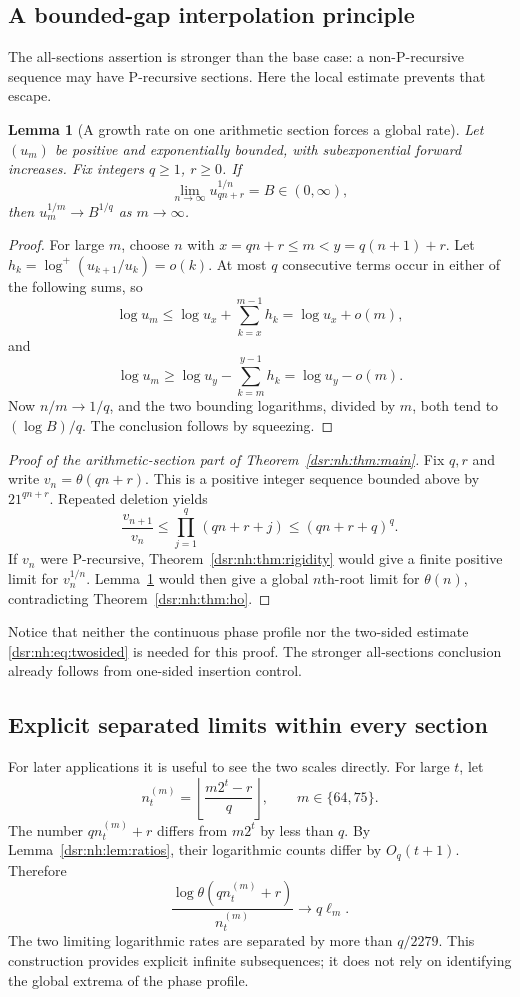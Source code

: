 \documentclass[11pt,a4paper]{article}
\numberwithin{equation}{section}
\newtheorem{lemma}[theorem]{Lemma}
\theoremstyle{definition}
\theoremstyle{remark}
\newcommand{\tht}{\theta}
\newcommand{\logp}{\log^{+}}
\theoremstyle{definition}
\theoremstyle{plain}
\begin{document}
\subsection{A bounded-gap interpolation principle}
The all-sections assertion is stronger than the base case: a
non-P-recursive sequence may have P-recursive sections. Here the local
estimate prevents that escape.

\begin{lemma}[A growth rate on one arithmetic section forces a global rate]
\label{dsr:nh:lem:sectionlimit}
Let $(u_m)$ be positive and exponentially bounded, with subexponential
forward increases. Fix integers $q\ge1$, $r\ge0$. If
\[
\lim_{n\to\infty}u_{qn+r}^{1/n}=B\in(0,\infty),
\]
then $u_m^{1/m}\to B^{1/q}$ as $m\to\infty$.
\end{lemma}
\begin{proof}
For large $m$, choose $n$ with $x=qn+r\le m<y=q(n+1)+r$.
Let $h_k=\logp(u_{k+1}/u_k)=o(k)$. At most $q$ consecutive terms occur
in either of the following sums, so
\[
\log u_m\le\log u_x+\sum_{k=x}^{m-1}h_k
=\log u_x+o(m),
\]
and
\[
\log u_m\ge\log u_y-\sum_{k=m}^{y-1}h_k
=\log u_y-o(m).
\]
Now $n/m\to1/q$, and the two bounding logarithms, divided by $m$,
both tend to $(\log B)/q$. The conclusion follows by squeezing.
\end{proof}

\begin{proof}[Proof of the arithmetic-section part of Theorem~\ref{dsr:nh:thm:main}]
Fix $q,r$ and write $v_n=\tht(qn+r)$. This is a positive integer sequence
bounded above by $21^{qn+r}$. Repeated deletion yields
\[
\frac{v_{n+1}}{v_n}
\le\prod_{j=1}^{q}(qn+r+j)
\le(qn+r+q)^q.
\]
If $v_n$ were P-recursive, Theorem~\ref{dsr:nh:thm:rigidity} would give a finite
positive limit for $v_n^{1/n}$. Lemma~\ref{dsr:nh:lem:sectionlimit} would then give
a global $n$th-root limit for $\tht(n)$, contradicting
Theorem~\ref{dsr:nh:thm:ho}.
\end{proof}
Notice that neither the continuous phase profile nor the two-sided
estimate \eqref{dsr:nh:eq:twosided} is needed for this proof. The stronger
all-sections conclusion already follows from one-sided insertion control.

\subsection{Explicit separated limits within every section}
For later applications it is useful to see the two scales directly.
For large $t$, let
\[
n_t^{(m)}=\left\lfloor\frac{m2^t-r}{q}\right\rfloor,
\qquad m\in\{64,75\}.
\]
The number $qn_t^{(m)}+r$ differs from $m2^t$ by less than $q$.
By Lemma~\ref{dsr:nh:lem:ratios}, their logarithmic counts differ by $O_q(t+1)$.
Therefore
\begin{equation}
\frac{\log\tht(qn_t^{(m)}+r)}{n_t^{(m)}}\longrightarrow q\ell_m.
\label{dsr:nh:eq:sectionphases}
\end{equation}
The two limiting logarithmic rates are separated by more than
$q/2279$. This construction provides explicit infinite subsequences;
it does not rely on identifying the global extrema of the phase profile.
\end{document}
